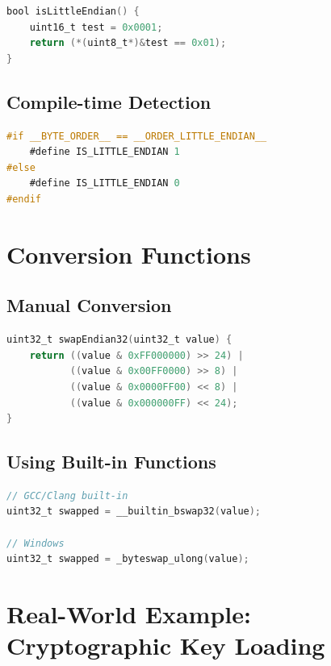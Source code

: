 \documentclass[11pt,a4paper]{article}
\begin{document}
\begin{lstlisting}[language=C, caption=Runtime Endianness Detection]
bool isLittleEndian() {
    uint16_t test = 0x0001;
    return (*(uint8_t*)&test == 0x01);
}
\end{lstlisting}

\subsection{Compile-time Detection}

\begin{lstlisting}[language=C, caption=Compile-time Endianness Detection]
#if __BYTE_ORDER__ == __ORDER_LITTLE_ENDIAN__
    #define IS_LITTLE_ENDIAN 1
#else
    #define IS_LITTLE_ENDIAN 0
#endif
\end{lstlisting}

\section{Conversion Functions}

\subsection{Manual Conversion}

\begin{lstlisting}[language=C, caption=Manual Endianness Conversion]
uint32_t swapEndian32(uint32_t value) {
    return ((value & 0xFF000000) >> 24) |
           ((value & 0x00FF0000) >> 8) |
           ((value & 0x0000FF00) << 8) |
           ((value & 0x000000FF) << 24);
}
\end{lstlisting}

\subsection{Using Built-in Functions}

\begin{lstlisting}[language=C, caption=Built-in Endianness Conversion]
// GCC/Clang built-in
uint32_t swapped = __builtin_bswap32(value);

// Windows
uint32_t swapped = _byteswap_ulong(value);
\end{lstlisting}

\section{Real-World Example: Cryptographic Key Loading}
\end{document}
